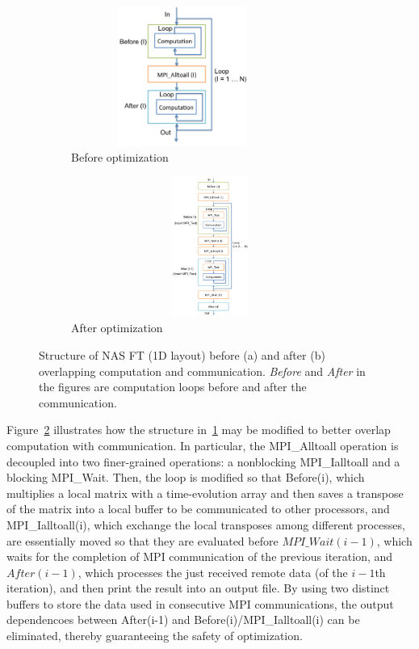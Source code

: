 \begin{figure}
  \centering
  \begin{subfigure}[b]{0.2\textwidth}
    \includegraphics[width=0.8\textwidth,height=1.8in]{fig/ft_loop.png}
    \caption{Before optimization}
    \label{fig:ft_loop}
  \end{subfigure}%
  \hspace{-.3in}
  \begin{subfigure}[b]{0.3\textwidth}
    \includegraphics[width=1.1\textwidth,height=1.8in]{fig/ft_cco.png}
    \caption{After optimization}
    \label{fig:ft_cco}
  \end{subfigure}
  \caption{Structure of NAS FT (1D layout) before (a) and after (b)
    overlapping computation and communication.  \emph{Before} and
    \emph{After} in the figures are computation loops before and after
    the communication.}
\label{fig:ft}
\end{figure}

Figure~\ref{fig:ft_cco} illustrates how the structure
in~\ref{fig:ft_loop} may be modified to better overlap computation
with communication.  In particular, the MPI\_Alltoall operation is
decoupled into two finer-grained operations: a nonblocking
MPI\_Ialltoall and a blocking MPI\_Wait.  Then, the loop is modified
so that Before(i), which multiplies a local matrix with a
time-evolution array and then saves a transpose of the matrix into a
local buffer to be communicated to other processors, and
MPI\_Ialltoall(i), which exchange the local transposes among different
processes, are essentially moved so that they are evaluated before
$MPI\_Wait(i-1)$, which waits for the completion of MPI communication
of the previous iteration, and $After(i-1)$, which processes the just
received remote data (of the $i-1$th iteration), and then print the
result into an output file.  By using two distinct buffers to store
the data used in consecutive MPI communications, the output
dependencoes between After(i-1) and Before(i)/MPI\_Ialltoall(i) can be
eliminated, thereby guaranteeing the safety of optimization.

